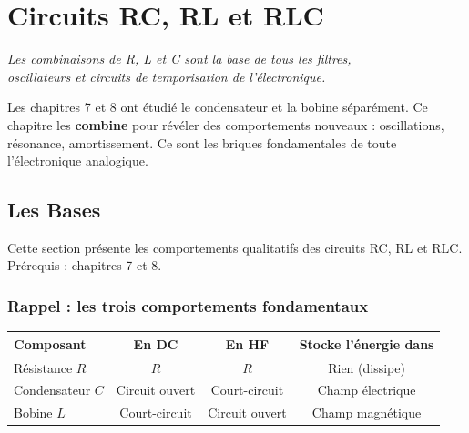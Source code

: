 \documentclass[12pt,a4paper,twoside]{book}
\begin{document}
\chapter{Circuits RC, RL et RLC}

\begin{center}
\textit{Les combinaisons de R, L et C sont la base de tous les filtres,\\
oscillateurs et circuits de temporisation de l'électronique.}
\end{center}

\vspace{0.5cm}

Les chapitres 7 et 8 ont étudié le condensateur et la bobine séparément. Ce chapitre les \textbf{combine} pour révéler des comportements nouveaux : oscillations, résonance, amortissement. Ce sont les briques fondamentales de toute l'électronique analogique.

\section{Les Bases}

\begin{bases}
Cette section présente les comportements qualitatifs des circuits RC, RL et RLC. Prérequis : chapitres 7 et 8.
\end{bases}

\subsection{Rappel : les trois comportements fondamentaux}

\begin{center}
\begin{tabular}{lccc}
\toprule
\textbf{Composant} & \textbf{En DC} & \textbf{En HF} & \textbf{Stocke l'énergie dans} \\
\midrule
Résistance $R$ & $R$ & $R$ & Rien (dissipe) \\
Condensateur $C$ & Circuit ouvert & Court-circuit & Champ électrique \\
Bobine $L$ & Court-circuit & Circuit ouvert & Champ magnétique \\
\bottomrule
\end{tabular}
\end{center}
\end{document}
